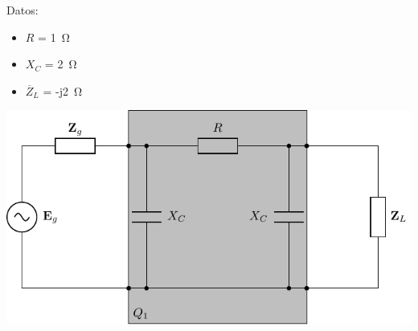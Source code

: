 \documentclass[12pt]{article}
\begin{document}
\begin{minipage}{0.3\textwidth}
  Datos:
  \begin{itemize}
  \item $R$ = \SI{1}{\ohm}
  \item $X_C$ = \SI{2}{\ohm}
  \item $\overline{Z}_L$ = -j\SI{2}{\ohm}
  \end{itemize}
\end{minipage}
\begin{minipage}{0.7\textwidth}
\includegraphics{figs/E5_circuito.pdf}
\end{minipage}
\end{document}
